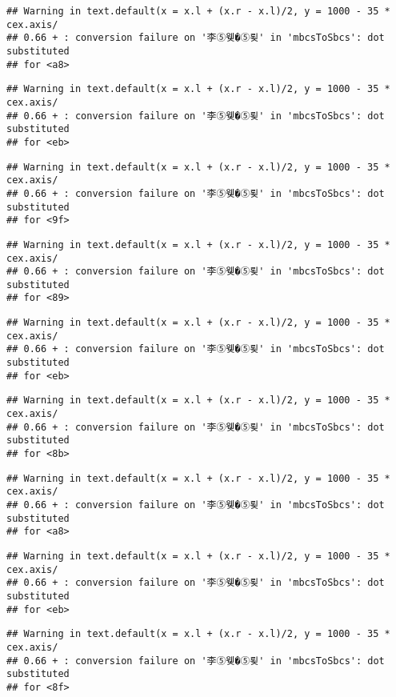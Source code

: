 \documentclass[]{article}
\begin{document}
\begin{verbatim}
## Warning in text.default(x = x.l + (x.r - x.l)/2, y = 1000 - 35 * cex.axis/
## 0.66 + : conversion failure on '李⑤웾�⑤룆' in 'mbcsToSbcs': dot substituted
## for <a8>
\end{verbatim}

\begin{verbatim}
## Warning in text.default(x = x.l + (x.r - x.l)/2, y = 1000 - 35 * cex.axis/
## 0.66 + : conversion failure on '李⑤웾�⑤룆' in 'mbcsToSbcs': dot substituted
## for <eb>
\end{verbatim}

\begin{verbatim}
## Warning in text.default(x = x.l + (x.r - x.l)/2, y = 1000 - 35 * cex.axis/
## 0.66 + : conversion failure on '李⑤웾�⑤룆' in 'mbcsToSbcs': dot substituted
## for <9f>
\end{verbatim}

\begin{verbatim}
## Warning in text.default(x = x.l + (x.r - x.l)/2, y = 1000 - 35 * cex.axis/
## 0.66 + : conversion failure on '李⑤웾�⑤룆' in 'mbcsToSbcs': dot substituted
## for <89>
\end{verbatim}

\begin{verbatim}
## Warning in text.default(x = x.l + (x.r - x.l)/2, y = 1000 - 35 * cex.axis/
## 0.66 + : conversion failure on '李⑤웾�⑤룆' in 'mbcsToSbcs': dot substituted
## for <eb>
\end{verbatim}

\begin{verbatim}
## Warning in text.default(x = x.l + (x.r - x.l)/2, y = 1000 - 35 * cex.axis/
## 0.66 + : conversion failure on '李⑤웾�⑤룆' in 'mbcsToSbcs': dot substituted
## for <8b>
\end{verbatim}

\begin{verbatim}
## Warning in text.default(x = x.l + (x.r - x.l)/2, y = 1000 - 35 * cex.axis/
## 0.66 + : conversion failure on '李⑤웾�⑤룆' in 'mbcsToSbcs': dot substituted
## for <a8>
\end{verbatim}

\begin{verbatim}
## Warning in text.default(x = x.l + (x.r - x.l)/2, y = 1000 - 35 * cex.axis/
## 0.66 + : conversion failure on '李⑤웾�⑤룆' in 'mbcsToSbcs': dot substituted
## for <eb>
\end{verbatim}

\begin{verbatim}
## Warning in text.default(x = x.l + (x.r - x.l)/2, y = 1000 - 35 * cex.axis/
## 0.66 + : conversion failure on '李⑤웾�⑤룆' in 'mbcsToSbcs': dot substituted
## for <8f>
\end{verbatim}
\end{document}
